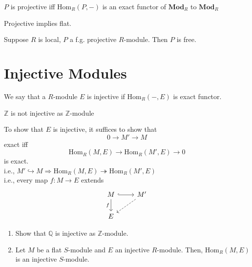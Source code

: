 \documentclass[oneside, 12pt]{scrbook}
\newcommand{\QQ}{\mathbb Q}
\newcommand{\ZZ}{\mathbb Z}
\newcommand{\Hom}{\mathrm{Hom}}
\theoremstyle{theorem}
\begin{document}
\begin{theorem}
$P$ is projective iff $\Hom_{R}(P,-)$ is an exact functor of $\mathbf{Mod}_{R}$ to $\mathbf{Mod}_{R}$
\end{theorem}

\begin{remark}
Projective implies flat.
\end{remark}

\begin{theorem}
Suppose $R$ is local, $P$ a f.g. projective $R$-module. Then $P$ is free. 
\end{theorem}

\section{Injective Modules}

\begin{definition}
We say that a $R$-module $E$ is injective if $\Hom_{R}(-,E)$ is exact functor.
\end{definition}

\begin{example}
$\ZZ$ is not injective as $\ZZ$-module 
\end{example}

\begin{remark}
To show that $E$ is injective, it suffices to show that 
\begin{equation}[*]
0 \rightarrow M' \rightarrow M
\end{equation}
exact iff 
\begin{equation}[**]
\Hom_{R}(M,E) \rightarrow \Hom_{R}(M',E) \rightarrow 0
\end{equation}
is exact. \\

i.e., $M' \hookrightarrow M \Rightarrow \Hom_{R}(M,E) \twoheadrightarrow \Hom_{R}(M',E)$ \\

i.e., every map $f: M \rightarrow E$ extends 
\[\begin{tikzcd}
	M & {M'} \\
	E
	\arrow[hook, from=1-1, to=1-2]
	\arrow["f"', from=1-1, to=2-1]
	\arrow[dashed, from=1-2, to=2-1]
\end{tikzcd}\]
\end{remark}

\begin{exercise}
\begin{enumerate}
\item Show that $\QQ$ is injective as $\ZZ$-module.
\item Let $M$ be a flat $S$-module and $E$ an injective $R$-module. Then, $\Hom_{R}(M,E)$ is an injective $S$-module.
\end{enumerate}
\end{exercise}
\end{document}
